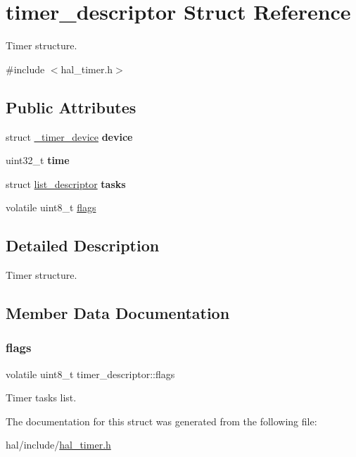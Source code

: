 \hypertarget{structtimer__descriptor}{}\section{timer\+\_\+descriptor Struct Reference}
\label{structtimer__descriptor}


Timer structure.  




{\ttfamily \#include $<$hal\+\_\+timer.\+h$>$}

\subsection*{Public Attributes}
\begin{DoxyCompactItemize}
\item 
\mbox{\label{structtimer__descriptor_aaae54f425893ae0dcb578c405f034f96}} 
struct \hyperlink{struct__timer__device}{\+\_\+timer\+\_\+device} {\bfseries device}
\item 
\mbox{\label{structtimer__descriptor_ae8617abc2461a928c93a43aabb79f9a8}} 
uint32\+\_\+t {\bfseries time}
\item 
\mbox{\label{structtimer__descriptor_a25ff58f1969452ce0fc5d03aa2742f50}} 
struct \hyperlink{structlist__descriptor}{list\+\_\+descriptor} {\bfseries tasks}
\item 
volatile uint8\+\_\+t \hyperlink{structtimer__descriptor_a0da64c93bdd7a16f2f9298c7735d30c6}{flags}
\end{DoxyCompactItemize}


\subsection{Detailed Description}
Timer structure. 

\subsection{Member Data Documentation}
\mbox{\label{structtimer__descriptor_a0da64c93bdd7a16f2f9298c7735d30c6}} 
\subsubsection{\texorpdfstring{flags}{flags}}
{\footnotesize\ttfamily volatile uint8\+\_\+t timer\+\_\+descriptor\+::flags}

Timer tasks list. 

The documentation for this struct was generated from the following file\+:\begin{DoxyCompactItemize}
\item 
hal/include/\hyperlink{hal__timer_8h}{hal\+\_\+timer.\+h}\end{DoxyCompactItemize}
